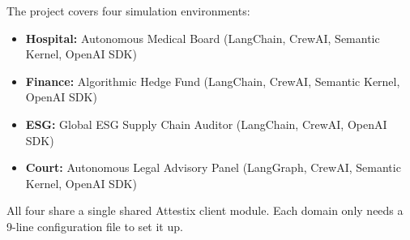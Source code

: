 The project covers four simulation environments:

\begin{itemize}
    \item \textbf{Hospital:} Autonomous Medical Board (LangChain, CrewAI, Semantic Kernel, OpenAI SDK)
    \item \textbf{Finance:} Algorithmic Hedge Fund (LangChain, CrewAI, Semantic Kernel, OpenAI SDK)
    \item \textbf{ESG:} Global ESG Supply Chain Auditor (LangChain, CrewAI, OpenAI SDK)
    \item \textbf{Court:} Autonomous Legal Advisory Panel (LangGraph, CrewAI, Semantic Kernel, OpenAI SDK)
\end{itemize}

All four share a single shared Attestix client module. Each domain only needs a 9-line configuration file to set it up.
